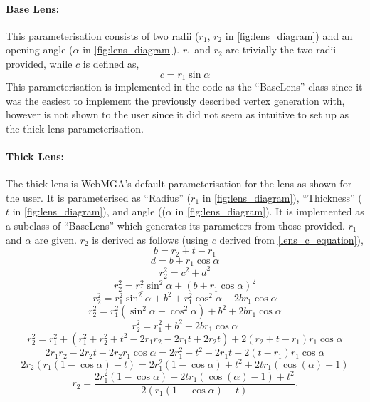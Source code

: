 \paragraph{Base Lens:}
\label{base_lens_para}
This parameterisation consists of two radii ($r_1$, $r_2$ in  \cref{fig:lens_diagram}) and an opening angle ($\alpha$ in  \cref{fig:lens_diagram}). $r_1$ and $r_2$ are trivially the two radii provided, while $c$ is defined as,
\begin{equation}
c=r_1\sin\alpha
\label{lens_c_equation}
\end{equation}
This parameterisation is implemented in the code as the ``BaseLens'' class since it was the easiest to implement the previously described vertex generation with, however is not shown to the user since it did not seem as intuitive to set up as the thick lens parameterisation.
\paragraph{Thick Lens:}
The thick lens is WebMGA's default parameterisation for the lens as shown for the user. It is parameterised as ``Radius'' ($r_1$ in \cref{fig:lens_diagram}), ``Thickness'' ($t$ in \cref{fig:lens_diagram}), and angle (($\alpha$ in \cref{fig:lens_diagram}). It is implemented as a subclass of ``BaseLens'' which generates its parameters from those provided. $r_1$ and $\alpha$ are given. $r_2$ is derived as follows (using $c$ derived from \cref{lens_c_equation}),
\begin{equation}
b= r_2+t-r_1
\end{equation}
\begin{equation}
d=b+r_1\cos\alpha
\end{equation}
\begin{equation}
r_2^2=c^2+d^2
\end{equation}
\begin{equation}
r_2^2=r_1^2\sin^2\alpha+(b+r_1\cos\alpha)^2
\end{equation}
\begin{equation}
r_2^2=r_1^2\sin^2\alpha+b^2+r_1^2\cos^2\alpha + 2br_1\cos\alpha
\end{equation}
\begin{equation}
r_2^2=r_1^2(\sin^2\alpha+\cos^2\alpha)+b^2 + 2br_1\cos\alpha
\end{equation}
\begin{equation}
r_2^2=r_1^2+b^2+ 2br_1\cos\alpha
\end{equation}
\begin{equation}
r_2^2=r_1^2+(r_1^2+r_2^2+t^2-2r_1r_2-2r_1t+2r_2t) + 2(r_2+t-r_1)r_1\cos\alpha
\end{equation}
\begin{equation}
2r_1r_2-2r_2t-2r_2r_1\cos\alpha=2r_1^2+t^2-2r_1t + 2(t-r_1)r_1\cos\alpha
\end{equation}
\begin{equation}
2r_2(r_1(1-\cos\alpha)-t)=2r_1^2(1-\cos\alpha)+t^2+2tr_1(\cos(\alpha)-1)
\end{equation}
\begin{equation}
r_2=\frac{2r_1^2(1-\cos\alpha)+2tr_1(\cos(\alpha)-1)+t^2}{2(r_1(1-\cos\alpha)-t)}.
\end{equation}

